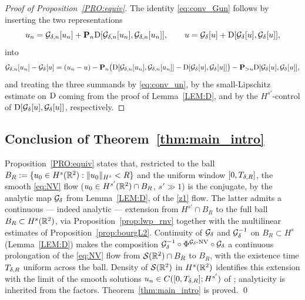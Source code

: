 \begin{proof}[Proof of Proposition~\textup{\ref{PRO:equiv}}]
The identity \eqref{eq:conv_Gun} follows by inserting the two
representations
\[
u_n=\mathcal{G}_{\delta,n}[u_n]+\mathbf{P}_n\mathrm{D}[\mathcal{G}_{\delta,n}[u_n],\mathcal{G}_{\delta,n}[u_n]],
\qquad
u=\mathcal{G}_\delta[u]+\mathrm{D}[\mathcal{G}_\delta[u],\mathcal{G}_\delta[u]],
\]
into
\[
\mathcal{G}_{\delta,n}[u_n]-\mathcal{G}_\delta[u]
= (u_n-u)
- \mathbf{P}_n\big(\mathrm{D}[\mathcal{G}_{\delta,n}[u_n],\mathcal{G}_{\delta,n}[u_n]]
- \mathrm{D}[\mathcal{G}_\delta[u],\mathcal{G}_\delta[u]]\big)
- \mathbf{P}_{>n}\mathrm{D}[\mathcal{G}_\delta[u],\mathcal{G}_\delta[u]],
\]
and treating the three summands by \eqref{eq:conv_un}, by the
small-Lipschitz estimate on $\mathrm{D}$ coming from the proof of
Lemma~\ref{LEM:D}, and by the $H^{s'}$-control of
$\mathrm{D}[\mathcal{G}_\delta[u],\mathcal{G}_\delta[u]]$, respectively.
\end{proof}

\subsection{Conclusion of Theorem~\ref{thm:main_intro}}

Proposition~\ref{PRO:equiv} states that, restricted to the ball
$B_R:=\{u_0\in H^s(\mathbb{R}^2):\|u_0\|_{H^s}<R\}$ and the uniform window
$[0,T_{\delta,R}]$, the smooth \eqref{eq:NV} flow
($u_0\in H^{s'}(\mathbb{R}^2)\cap B_R$, $s'\gg 1$) is the conjugate, by the
analytic map $\mathcal{G}_\delta$ from Lemma~\ref{LEM:D}, of the \eqref{z1}
flow. The latter admits a continuous --- indeed analytic ---
extension from $H^{s'}\cap B_R$ to the full ball $B_R\subset H^s(\mathbb{R}^2)$,
via Proposition~\ref{prop:lwp_rnv} together with the multilinear
estimates of Proposition~\ref{prop:bourgL2}. Continuity of $\mathcal{G}_\delta$
and $\mathcal{G}_\delta^{-1}$ on $B_R\subset H^s$ (Lemma~\ref{LEM:D}) makes the
composition
$\mathcal{G}_\delta^{-1}\circ\Phi^{\mathcal{G}_\delta\text{-NV}}\circ\mathcal{G}_\delta$
a continuous prolongation of the \eqref{eq:NV} flow from
$\mathcal{S}(\mathbb{R}^2)\cap B_R$ to $B_R$, with the existence time
$T_{\delta,R}$ uniform across the ball. Density of
$\mathcal{S}(\mathbb{R}^2)$ in $H^s(\mathbb{R}^2)$ identifies this extension with
the limit of the smooth solutions
$u_n\in C([0,T_{\delta,R}];H^{s'})$ of
\cite{angelopolous,kazeykinamunoz1,kazeykinamunoz2}; analyticity is
inherited from the factors. Theorem~\ref{thm:main_intro} is
proved.
\qed
